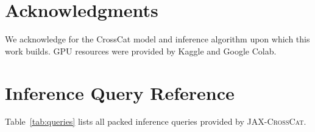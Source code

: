 \documentclass[11pt]{article}
\newcommand{\jaxcc}{\textsc{JAX-CrossCat}}
\begin{document}
\section*{Acknowledgments}

We acknowledge \citet{mansinghka2016crosscat} for the CrossCat model and
inference algorithm upon which this work builds. GPU resources were
provided by Kaggle and Google Colab.




\appendix

\section{Inference Query Reference}
\label{app:queries}

Table~\ref{tab:queries} lists all packed inference queries provided by
\jaxcc{}.
\end{document}
